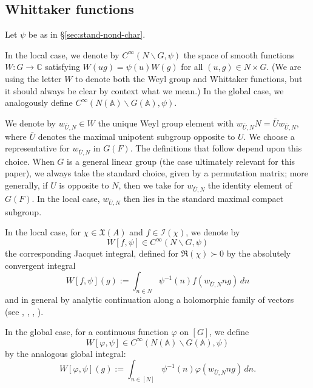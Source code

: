 \documentclass[reqno]{amsart}
\theoremstyle{plain} \newtheorem{theorem} {Theorem}
\theoremstyle{definition} \newtheorem{definition} [theorem] {Definition}
\theoremstyle{itplain} %
\numberwithin{equation}{section}
\numberwithin{theorem}{section}
\begin{document}
\subsection{Whittaker functions}\label{sec:whittaker-functions-1}
Let $\psi$ be as in \S\ref{sec:stand-nond-char}.

In the local case, we denote by $C^\infty(N \backslash G, \psi)$ the space of smooth functions $W : G \rightarrow \mathbb{C}$ satisfying $W(u g) = \psi(u) W(g)$ for all $(u,g) \in N \times G$.  (We are using the letter $W$ to denote both the Weyl group and Whittaker functions, but it should always be clear by context what we mean.)  In the global case, we analogously define $C^\infty(N(\mathbb{A}) \backslash G(\mathbb{A}), \psi)$.

We denote by $w_{\bar{U},N} \in W$ the unique Weyl group element with $w_{\bar{U},N} N = \bar{U} w_{\bar{U},N}$, where $\bar{U}$ denotes the maximal unipotent subgroup opposite to $U$.  We choose a representative for $w _{\overline{U}, N}$ in $G(F)$.  The definitions that follow depend upon this choice.  When $G$ is a general linear group (the case ultimately relevant for this paper), we always take the standard choice, given by a permutation matrix; more generally, if $U$ is opposite to $N$, then we take for $w_{\overline{U}, N}$ the identity element of $G(F)$.  In the local case, $w _{\overline{U},N}$ then lies in the standard maximal compact subgroup.

In the local case, for $\chi \in \mathfrak{X}(A)$ and $f \in \mathcal{I}(\chi)$, we denote by
\begin{equation*}
W[f,\psi] \in C^\infty(N \backslash G, \psi)
\end{equation*}
the corresponding Jacquet integral, defined for $\Re(\chi) \succ 0$ by the absolutely convergent integral 
\begin{equation*}
  W[f, \psi](g) := \int _{n \in N} \psi^{-1}(n)
  f(w_{\bar{U},N} n g) \, d n
\end{equation*}
and in general by analytic continuation along a holomorphic family of vectors (see \cite[\S3]{MR716292}, \cite[\S7.2]{MR2533003}, \cite[\S15]{MR1170566}, \cite{MR563369}).

In the global case, for a continuous function $\varphi$ on $[G]$, we define
\begin{equation*}
  W[\varphi,\psi] \in C^\infty(N(\mathbb{A}) \backslash G(\mathbb{A}), \psi)
\end{equation*}
by the analogous global integral:
\begin{equation*}
  W[\varphi, \psi](g) := \int _{n \in [N]} \psi^{-1}(n)
  \varphi(w_{\bar{U},N} n g) \, d n.
\end{equation*}
\end{document}

